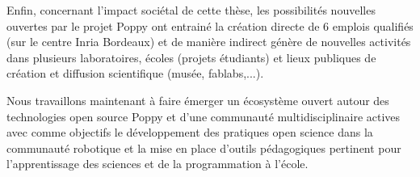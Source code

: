 Enfin, concernant l'impact sociétal de cette thèse, les possibilités nouvelles ouvertes par le projet Poppy ont entrainé la création directe de 6 emplois qualifiés (sur le centre Inria Bordeaux) et de manière indirect génère de nouvelles activités dans plusieurs laboratoires, écoles (projets étudiants) et lieux publiques de création et diffusion scientifique (musée, fablabs,...).

Nous travaillons maintenant à faire émerger un écosystème ouvert autour des technologies open source Poppy et d'une communauté multidisciplinaire actives avec comme objectifs le développement des pratiques open science dans la communauté robotique et la mise en place d'outils pédagogiques pertinent pour l'apprentissage des sciences et de la programmation à l'école.






